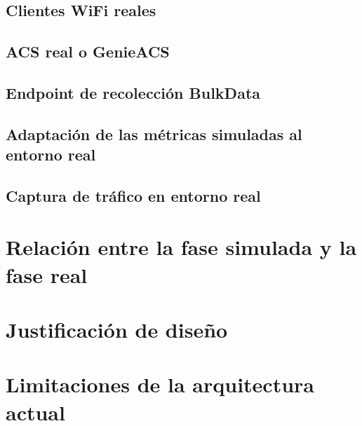 \subsection{Clientes WiFi reales}
\label{subsec:clientes-wifi-reales}

\subsection{ACS real o GenieACS}
\label{subsec:acs-real-o-genieacs}

\subsection{Endpoint de recolección BulkData}
\label{subsec:endpoint-recoleccion-bulkdata}

\subsection{Adaptación de las métricas simuladas al entorno real}
\label{subsec:adaptacion-metricas-simuladas-entorno-real}

\subsection{Captura de tráfico en entorno real}
\label{subsec:captura-trafico-entorno-real}


\section{Relación entre la fase simulada y la fase real}
\label{sec:relacion-fase-simulada-fase-real}


\section{Justificación de diseño}
\label{sec:justificacion-diseno}


\section{Limitaciones de la arquitectura actual}
\label{sec:limitaciones-arquitectura-actual}